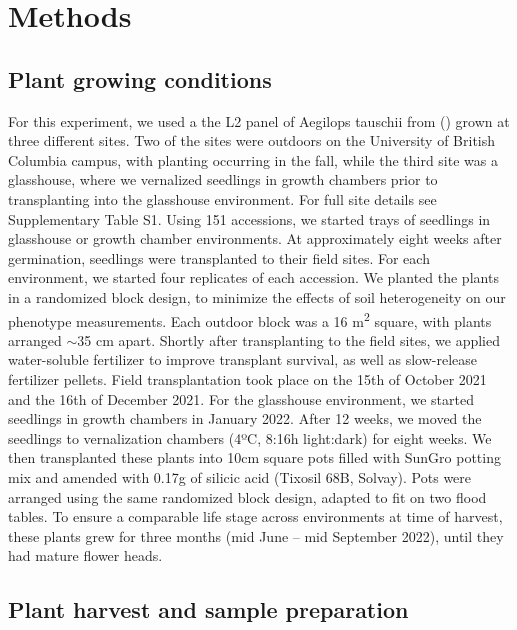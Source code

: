 \documentclass[12pt, letterpaper, ]{report}
\begin{document}
\section{Methods}

\subsection{Plant growing conditions}

For this experiment, we used a the L2 panel of Aegilops tauschii from (\cite{gaurav_population_2021}) grown at three different sites. Two of the sites were outdoors on the University of British Columbia campus, with planting occurring in the fall, while the third site was a glasshouse, where we vernalized seedlings in growth chambers prior to transplanting into the glasshouse environment. For full site details see Supplementary Table S1. Using 151 accessions, we started trays of seedlings in glasshouse or growth chamber environments. At approximately eight weeks after germination, seedlings were transplanted to their field sites. For each environment, we started four replicates of each accession. We planted the plants in a randomized block design, to minimize the effects of soil heterogeneity on our phenotype measurements. Each outdoor block was a 16 m\textsuperscript{2} square, with plants arranged $\sim$35 cm apart. Shortly after transplanting to the field sites, we applied water-soluble fertilizer to improve transplant survival, as well as slow-release fertilizer pellets. Field transplantation took place on the 15th of October 2021 and the 16th of December 2021. For the glasshouse environment, we started seedlings in growth chambers in January 2022. After 12 weeks, we moved the seedlings to vernalization chambers (4ºC, 8:16h light:dark) for eight weeks. We then transplanted these plants into 10cm square pots filled with SunGro potting mix and amended with 0.17g of silicic acid (Tixosil 68B, Solvay). Pots were arranged using the same randomized block design, adapted to fit on two flood tables. To ensure a comparable life stage across environments at time of harvest, these plants grew for three months (mid June – mid September 2022), until they had mature flower heads. 

\subsection{Plant harvest and sample preparation}
\end{document}

